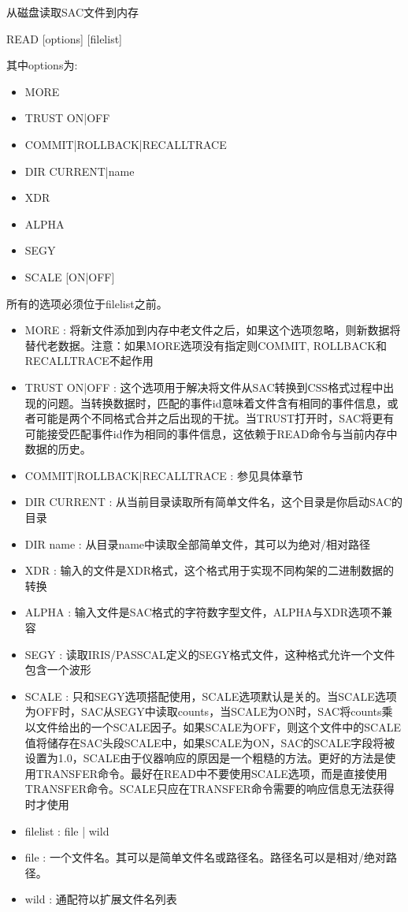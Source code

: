 \label{cmd:read}

从磁盘读取SAC文件到内存

READ [options] [filelist]

其中options为:
\begin{itemize}
\item MORE
\item TRUST ON|OFF
\item COMMIT|ROLLBACK|RECALLTRACE
\item DIR CURRENT|name  
\item XDR  
\item ALPHA  
\item SEGY  
\item SCALE [ON|OFF] 
\end{itemize}
所有的选项必须位于filelist之前。

\begin{itemize}
\item MORE : 将新文件添加到内存中老文件之后，如果这个选项忽略，则新数据将替代老数据。注意：如果MORE选项没有指定则COMMIT, ROLLBACK和RECALLTRACE不起作用
\item TRUST ON|OFF : 这个选项用于解决将文件从SAC转换到CSS格式过程中出现的问题。当转换数据时，匹配的事件id意味着文件含有相同的事件信息，或者可能是两个不同格式合并之后出现的干扰。当TRUST打开时，SAC将更有可能接受匹配事件id作为相同的事件信息，这依赖于READ命令与当前内存中数据的历史。
\item COMMIT|ROLLBACK|RECALLTRACE : 参见具体章节 
\item DIR CURRENT : 从当前目录读取所有简单文件名，这个目录是你启动SAC的目录 
\item DIR name : 从目录name中读取全部简单文件，其可以为绝对/相对路径 
\item XDR : 输入的文件是XDR格式，这个格式用于实现不同构架的二进制数据的转换 
\item ALPHA : 输入文件是SAC格式的字符数字型文件，ALPHA与XDR选项不兼容 
\item SEGY : 读取IRIS/PASSCAL定义的SEGY格式文件，这种格式允许一个文件包含一个波形 
\item SCALE : 只和SEGY选项搭配使用，SCALE选项默认是关的。当SCALE选项为OFF时，SAC从SEGY中读取counts，当SCALE为ON时，SAC将counts乘以文件给出的一个SCALE因子。如果SCALE为OFF，则这个文件中的SCALE值将储存在SAC头段SCALE中，如果SCALE为ON，SAC的SCALE字段将被设置为1.0，SCALE由于仪器响应的原因是一个粗糙的方法。更好的方法是使用TRANSFER命令。最好在READ中不要使用SCALE选项，而是直接使用TRANSFER命令。SCALE只应在TRANSFER命令需要的响应信息无法获得时才使用 
\item filelist :  file | wild 
\item file : 一个文件名。其可以是简单文件名或路径名。路径名可以是相对/绝对路径。
\item wild : 通配符以扩展文件名列表 
\end{itemize}

